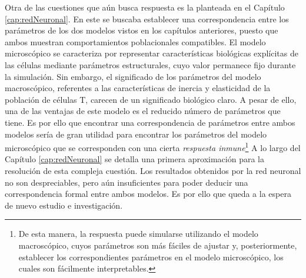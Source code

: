 Otra de las cuestiones que aún busca respuesta es la planteada en el Capítulo \ref{cap:redNeuronal}. En este se buscaba establecer una correspondencia entre los parámetros de los dos modelos vistos en los capítulos anteriores, puesto que ambos muestran comportamientos poblacionales compatibles. El modelo microscópico se caracteriza por representar características biológicas explícitas de las células mediante parámetros estructurales, cuyo valor permanece fijo durante la simulación. Sin embargo, el significado de los parámetros del modelo macroscópico, referentes a las características de inercia y elasticidad de la población de células T, carecen de un significado biológico claro. A pesar de ello, una de las ventajas de este modelo es el reducido número de parámetros que tiene. Es por ello que encontrar una correspondencia de parámetros entre ambos modelos sería de gran utilidad para encontrar los parámetros del modelo microscópico que se corresponden con una cierta \textit{respuesta inmune}\footnote{De esta manera, la respuesta puede simularse utilizando el modelo macroscópico, cuyos parámetros son más fáciles de ajustar y, posteriormente, establecer los correspondientes parámetros en el modelo microscópico, los cuales son fácilmente interpretables.} A lo largo del Capítulo  \ref{cap:redNeuronal} se detalla una primera aproximación para la resolución de esta compleja cuestión. Los resultados obtenidos por la red neuronal no son despreciables, pero aún insuficientes para poder deducir una correspondencia formal entre ambos modelos. Es por ello que queda a la espera de nuevo estudio e investigación.

